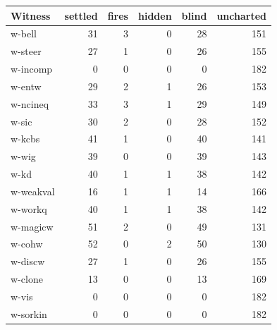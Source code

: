 \begin{tabular}{@{}lrrrrr@{}}\toprule
Witness & settled & fires & hidden & blind & uncharted \\\midrule
w-bell & 31 & 3 & 0 & 28 & 151 \\
w-steer & 27 & 1 & 0 & 26 & 155 \\
w-incomp & 0 & 0 & 0 & 0 & 182 \\
w-entw & 29 & 2 & 1 & 26 & 153 \\
w-ncineq & 33 & 3 & 1 & 29 & 149 \\
w-sic & 30 & 2 & 0 & 28 & 152 \\
w-kcbs & 41 & 1 & 0 & 40 & 141 \\
w-wig & 39 & 0 & 0 & 39 & 143 \\
w-kd & 40 & 1 & 1 & 38 & 142 \\
w-weakval & 16 & 1 & 1 & 14 & 166 \\
w-workq & 40 & 1 & 1 & 38 & 142 \\
w-magicw & 51 & 2 & 0 & 49 & 131 \\
w-cohw & 52 & 0 & 2 & 50 & 130 \\
w-discw & 27 & 1 & 0 & 26 & 155 \\
w-clone & 13 & 0 & 0 & 13 & 169 \\
w-vis & 0 & 0 & 0 & 0 & 182 \\
w-sorkin & 0 & 0 & 0 & 0 & 182 \\
\bottomrule\end{tabular}
